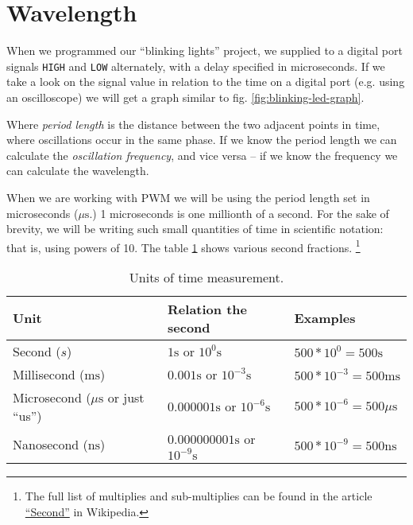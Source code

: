 \documentclass[../sparc.tex]{subfiles}
\begin{document}
\section{Wavelength}


When we programmed our ``blinking lights'' project, we supplied to a digital
port signals \texttt{HIGH} and \texttt{LOW} alternately, with a delay specified
in microseconds.  If we take a look on the signal value in relation to the time
on a digital port (e.g. using an oscilloscope) we will get a graph similar to
fig. \ref{fig:blinking-led-graph}.

Where \emph{period length} is the distance between the two adjacent points in
time, where oscillations occur in the same phase.  If we know the period length
we can calculate the \emph{oscillation frequency}, and vice versa -- if we know
the frequency we can calculate the wavelength.

When we are working with \gls{PWM} we will be using the period length set in
microseconds ($\mu\mbox{s}$.)  1 microseconds is one millionth of a second.  For
the sake of brevity, we will be writing such small quantities of time in
scientific notation: that is, using powers of 10.  The table
\ref{table:timescale-units} shows various second fractions.  \footnote{The full
list of multiplies and sub-multiplies can be found in the article
\href{https://en.wikipedia.org/wiki/Second}{``Second''} in Wikipedia.}

\begin{table}[H]
  \begin{tabular}{p{3cm}|p{4cm}|p{3cm}}
    Unit & Relation the second & Examples \\
    \hline \hline
    Second ($s$)
    & $ 1 \mbox{s} $ or $ 10^0 \mbox{s} $
    & $ 500 * 10^{0} = 500 \mbox{s} $ \\
    \hline
    Millisecond ($\mbox{ms}$)
    & $ 0.001 \mbox{s} $ or $ 10^{-3} \mbox{s} $
    & $ 500 * 10^{-3} = 500 \mbox{ms} $ \\
    \hline
    Microsecond ($\mu\mbox{s}$ or just ``us'')
    & $ 0.000001 \mbox{s} $ or $ 10^{-6} \mbox{s} $
    & $ 500 * 10^{-6} = 500 \mu\mbox{s} $ \\
    \hline
    Nanosecond ($\mbox{ns}$)
    & $ 0.000000001 \mbox{s} $ or $ 10^{-9} \mbox{s} $
    & $ 500 * 10^{-9} = 500 \mbox{ns} $
  \end{tabular}
  \caption{Units of time measurement.}
  \label{table:timescale-units}
\end{table}
\end{document}
